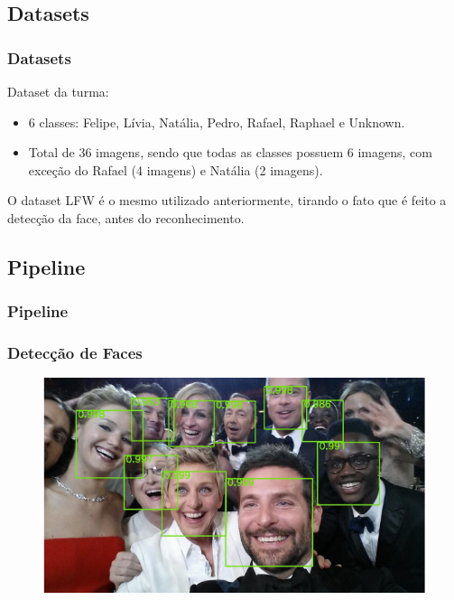 \documentclass{beamer}
\begin{document}
\subsection{Datasets}
\begin{frame}
\frametitle{Datasets}
Dataset da turma:
\begin{itemize}
    \item 6 classes: Felipe, Lívia, Natália, Pedro, Rafael, Raphael e Unknown.
    \item Total de 36 imagens, sendo que todas as classes possuem 6 imagens, com exceção do Rafael (4 imagens) e Natália (2 imagens).
\end{itemize}  
O dataset LFW é o mesmo utilizado anteriormente, tirando o fato que é feito a detecção da face, antes do reconhecimento.
\end{frame}
\begin{frame}
\subsection{Pipeline}
\frametitle{Pipeline}
\end{frame}


\begin{frame}
\frametitle{Detecção de Faces}
\begin{figure}
\includegraphics[width=0.95\linewidth]{figs/face_detection.png}
\end{figure}   
\end{frame}
\end{document}
